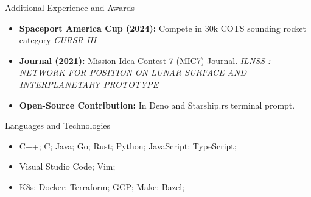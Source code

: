 \documentclass[]{patrickchodev-cv}
\begin{document}
	\begin{cvsection}{Additional Experience and Awards}
		\begin{cvsubsection}{}{}{}	
			\begin{itemize}
				\item \textbf{Spaceport America Cup (2024):} Compete in 30k COTS sounding rocket category \textit{CURSR-III}
				\item \textbf{Journal (2021):} Mission Idea Contest 7 (MIC7) Journal. \textit{ILNSS : NETWORK FOR POSITION ON LUNAR SURFACE AND INTERPLANETARY PROTOTYPE}
				\item \textbf{Open-Source Contribution:} In Deno and Starship.rs terminal prompt.
			\end{itemize}
		\end{cvsubsection}
	\end{cvsection}
	
	\begin{cvsection}{Languages and Technologies}
		\begin{cvsubsection}{}{}{}	
			\begin{itemize}
				\item C++; C; Java; Go; Rust; Python; JavaScript; TypeScript;
				\item Visual Studio Code; Vim;
				\item K8s; Docker; Terraform; GCP; Make; Bazel;
			\end{itemize}
		\end{cvsubsection}
	\end{cvsection}
	
\end{document}

